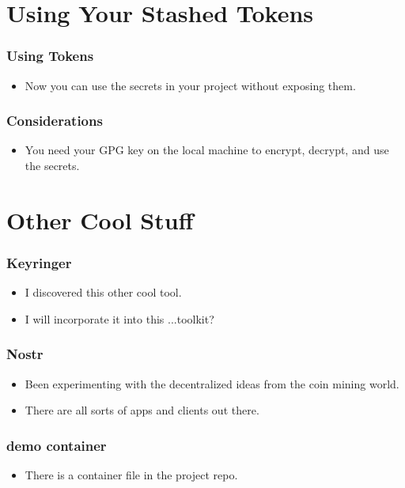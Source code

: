 \documentclass[aspectratio=169]{beamer}
\makeatletter
\def\sectionsubtitle#1{\gdef\@sectionsubtitle{#1}}
\gdef\@sectionsubtitle{}
\makeatother
\begin{document}
\sectionsubtitle{How to Use What You Built}
\section{Using Your Stashed Tokens}

\begin{frame}
	\frametitle{Using Tokens}
	\begin{itemize}
		\item Now you can use the secrets in your project without exposing them.
	\end{itemize}
\end{frame}

\begin{frame}
	\frametitle{Considerations}
	\begin{itemize}
		\item You need your GPG key on the local machine to encrypt, decrypt, and use the secrets.
	\end{itemize}
\end{frame}

\sectionsubtitle{Where is all this going?}
\section{Other Cool Stuff}

\begin{frame}
    \frametitle{Keyringer}
    \begin{itemize}
        \item I discovered this other cool tool.
        \item I will incorporate it into this ...toolkit?
    \end{itemize}
\end{frame}

\begin{frame}
    \frametitle{Nostr}
    \begin{itemize}
        \item Been experimenting with the decentralized ideas from the coin mining world.
        \item There are all sorts of apps and clients out there.
    \end{itemize}
\end{frame}

\begin{frame}
    \frametitle{demo container}
    \begin{itemize}
        \item There is a container file in the project repo.
    \end{itemize}
\end{frame}
\end{document}
